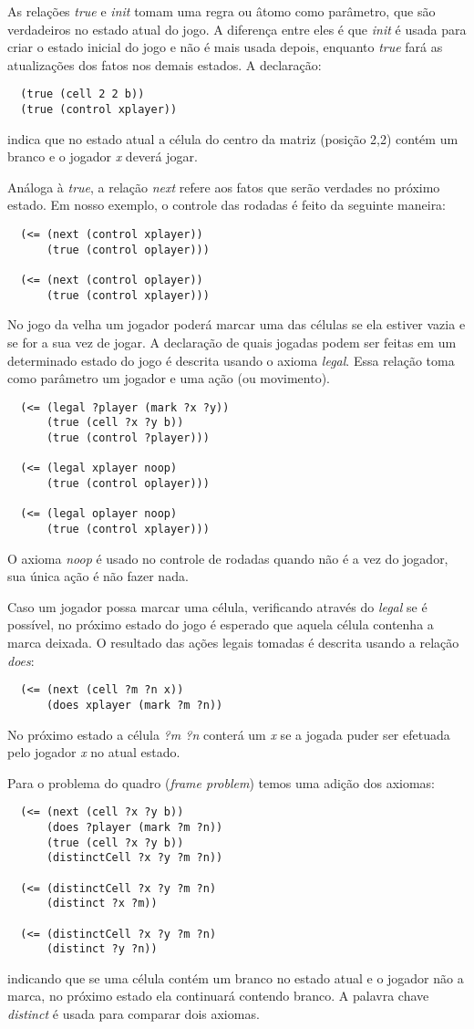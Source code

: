 As relações {\it true} e {\it init} tomam uma regra ou âtomo como parâmetro, que
são verdadeiros no estado atual do jogo. A diferença entre eles é que {\it init}
é usada para criar o estado inicial do jogo e não é mais usada depois, enquanto
{\it true} fará as atualizações dos fatos nos demais estados. A declaração:
\begin{verbatim}
  (true (cell 2 2 b))
  (true (control xplayer))
\end{verbatim}
indica que no estado atual a célula do centro da matriz (posição 2,2) contém um
branco e o jogador {\it x} deverá jogar.

Análoga à {\it true}, a relação {\it next} refere aos fatos que serão verdades
no próximo estado. Em nosso exemplo, o controle das rodadas é feito da seguinte
maneira: 
\begin{verbatim}
  (<= (next (control xplayer))
      (true (control oplayer)))

  (<= (next (control oplayer))
      (true (control xplayer)))
\end{verbatim}

No jogo da velha um jogador poderá marcar uma das células se ela estiver vazia e
se for a sua vez de jogar. A declaração de quais jogadas podem ser feitas em um
determinado estado do jogo é descrita usando o axioma {\it legal}. Essa relação
toma como parâmetro um jogador e uma ação (ou movimento).
\begin{verbatim}
  (<= (legal ?player (mark ?x ?y))
      (true (cell ?x ?y b))
      (true (control ?player)))

  (<= (legal xplayer noop)
      (true (control oplayer)))

  (<= (legal oplayer noop)
      (true (control xplayer)))
\end{verbatim}
O axioma {\it noop} é usado no controle de rodadas quando não é a vez do
jogador, sua única ação é não fazer nada.


Caso um jogador possa marcar uma célula, verificando através do {\it legal} se é
possível, no próximo estado do jogo é esperado que aquela célula contenha a
marca deixada. O resultado das ações legais tomadas é descrita usando a relação
{\it does}:
\begin{verbatim}
  (<= (next (cell ?m ?n x))
      (does xplayer (mark ?m ?n))
\end{verbatim}
No próximo estado a célula {\it ?m ?n} conterá um {\it x} se a jogada puder ser
efetuada pelo jogador {\it x} no atual estado.

Para o problema do quadro ({\it frame problem}) temos uma adição dos axiomas:
\begin{verbatim}
  (<= (next (cell ?x ?y b))
      (does ?player (mark ?m ?n))
      (true (cell ?x ?y b))
      (distinctCell ?x ?y ?m ?n))

  (<= (distinctCell ?x ?y ?m ?n)
      (distinct ?x ?m))

  (<= (distinctCell ?x ?y ?m ?n)
      (distinct ?y ?n))
\end{verbatim}
indicando que se uma célula contém um branco no estado atual e o jogador não a
marca, no próximo estado ela continuará contendo branco. A palavra chave {\it distinct} 
é usada para comparar dois axiomas.

